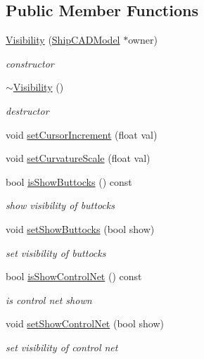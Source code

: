 \subsection*{Public Member Functions}
\begin{DoxyCompactItemize}
\item 
\hyperlink{classShipCAD_1_1Visibility_a7b3d38d4dd65392de8b2bac001afe6e8}{Visibility} (\hyperlink{classShipCAD_1_1ShipCADModel}{Ship\-C\-A\-D\-Model} $\ast$owner)
\begin{DoxyCompactList}\small\item\em constructor \end{DoxyCompactList}\item 
\hyperlink{classShipCAD_1_1Visibility_a653098c74de41abb0a46c455b24c9d3a}{$\sim$\-Visibility} ()
\begin{DoxyCompactList}\small\item\em destructor \end{DoxyCompactList}\item 
void \hyperlink{classShipCAD_1_1Visibility_a665efac6ef5dfdd3baab521fcbd96cb6}{set\-Cursor\-Increment} (float val)
\item 
void \hyperlink{classShipCAD_1_1Visibility_a5487027d259912f366351938a1a87085}{set\-Curvature\-Scale} (float val)
\item 
bool \hyperlink{classShipCAD_1_1Visibility_a293f2a74bb76c65b7fa706e8aac353f1}{is\-Show\-Buttocks} () const 
\begin{DoxyCompactList}\small\item\em show visibility of buttocks \end{DoxyCompactList}\item 
void \hyperlink{classShipCAD_1_1Visibility_a8e7776fdc776e8fa96b7e9bce1cffdce}{set\-Show\-Buttocks} (bool show)
\begin{DoxyCompactList}\small\item\em set visibility of buttocks \end{DoxyCompactList}\item 
bool \hyperlink{classShipCAD_1_1Visibility_a177cc880657723c1cbcc4c66c16ee208}{is\-Show\-Control\-Net} () const 
\begin{DoxyCompactList}\small\item\em is control net shown \end{DoxyCompactList}\item 
void \hyperlink{classShipCAD_1_1Visibility_a7498435ee6955772713b113a63279260}{set\-Show\-Control\-Net} (bool show)
\begin{DoxyCompactList}\small\item\em set visibility of control net \end{DoxyCompactList}\item 

\end{DoxyCompactItemize}
